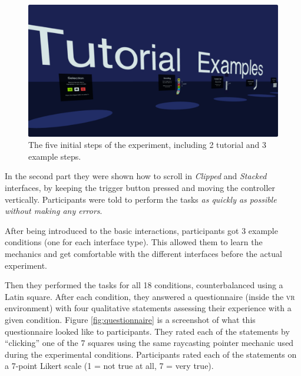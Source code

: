 \documentclass[nobib]{tufte-book} %
\begin{document}
\begin{figure}[h]
  \includegraphics[width=\linewidth]{tutorials.png}
  \caption{The five initial steps of the experiment, including 2 tutorial and 3 example steps.}
  \label{fig:tutorials}
\end{figure}

In the second part they were shown how to scroll in \emph{Clipped} and \emph{Stacked} interfaces, by keeping the trigger button pressed and moving the controller vertically.
Participants were told to perform the tasks \emph{as quickly as possible without making any errors}.

After being introduced to the basic interactions, participants got 3 example conditions (one for each interface type). This allowed them to learn the mechanics and get comfortable with the different interfaces before the actual experiment.

Then they performed the tasks for all 18 conditions, counterbalanced using a Latin square. After each condition, they answered a questionnaire (inside the \textsc{vr} environment) with four qualitative statements assessing their experience with a given condition. Figure \ref{fig:questionnaire} is a screenshot of what this questionnaire looked like to participants. They rated each of the statements by ``clicking'' one of the 7 squares using the same raycasting pointer mechanic used during the experimental conditions. Participants rated each of the statements on a 7-point Likert scale (1 = not true at all, 7 = very true).
\end{document}
